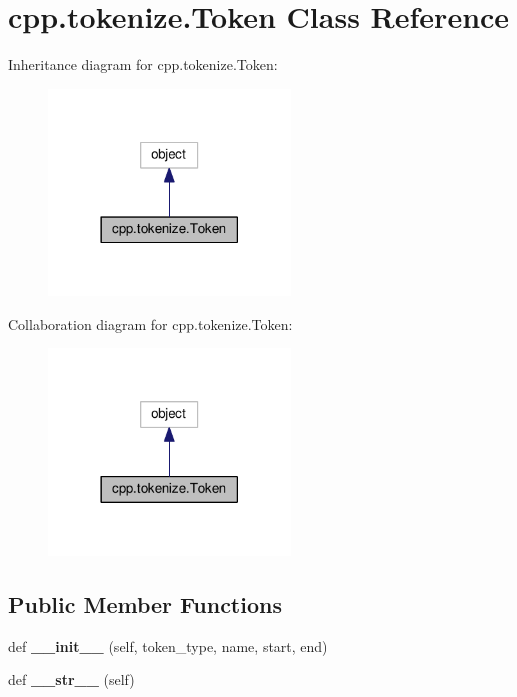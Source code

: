 \hypertarget{classcpp_1_1tokenize_1_1Token}{}\section{cpp.\+tokenize.\+Token Class Reference}
\label{classcpp_1_1tokenize_1_1Token}


Inheritance diagram for cpp.\+tokenize.\+Token\+:\nopagebreak
\begin{figure}[H]
\begin{center}
\leavevmode
\includegraphics[width=182pt]{classcpp_1_1tokenize_1_1Token__inherit__graph}
\end{center}
\end{figure}


Collaboration diagram for cpp.\+tokenize.\+Token\+:\nopagebreak
\begin{figure}[H]
\begin{center}
\leavevmode
\includegraphics[width=182pt]{classcpp_1_1tokenize_1_1Token__coll__graph}
\end{center}
\end{figure}
\subsection*{Public Member Functions}
\begin{DoxyCompactItemize}
\item 
def {\bfseries \+\_\+\+\_\+init\+\_\+\+\_\+} (self, token\+\_\+type, name, start, end)\hypertarget{classcpp_1_1tokenize_1_1Token_a7da7659a5a6c61d0f4b8590cf96e19fd}{}\label{classcpp_1_1tokenize_1_1Token_a7da7659a5a6c61d0f4b8590cf96e19fd}

\item 
def {\bfseries \+\_\+\+\_\+str\+\_\+\+\_\+} (self)\hypertarget{classcpp_1_1tokenize_1_1Token_a98e024051039637a18601fcbb0232cc2}{}\label{classcpp_1_1tokenize_1_1Token_a98e024051039637a18601fcbb0232cc2}

\end{DoxyCompactItemize}
